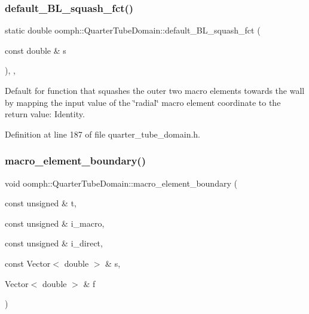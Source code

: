 \mbox{\label{classoomph_1_1QuarterTubeDomain_a3dc9c2857eb6bd7e3ee89d2a7c86bd3b}} 
\subsubsection{\texorpdfstring{default\+\_\+\+B\+L\+\_\+squash\+\_\+fct()}{default\_BL\_squash\_fct()}}
{\footnotesize\ttfamily static double oomph\+::\+Quarter\+Tube\+Domain\+::default\+\_\+\+B\+L\+\_\+squash\+\_\+fct (\begin{DoxyParamCaption}\item[{const double \&}]{s }\end{DoxyParamCaption})\hspace{0.3cm}{\ttfamily [inline]}, {\ttfamily [static]}, {\ttfamily [private]}}



Default for function that squashes the outer two macro elements towards the wall by mapping the input value of the \char`\"{}radial\char`\"{} macro element coordinate to the return value\+: Identity. 



Definition at line 187 of file quarter\+\_\+tube\+\_\+domain.\+h.

\mbox{\label{classoomph_1_1QuarterTubeDomain_afacee4fe8a6fbc33618643398f5b8ab1}} 
\subsubsection{\texorpdfstring{macro\+\_\+element\+\_\+boundary()}{macro\_element\_boundary()}}
{\footnotesize\ttfamily void oomph\+::\+Quarter\+Tube\+Domain\+::macro\+\_\+element\+\_\+boundary (\begin{DoxyParamCaption}\item[{const unsigned \&}]{t,  }\item[{const unsigned \&}]{i\+\_\+macro,  }\item[{const unsigned \&}]{i\+\_\+direct,  }\item[{const Vector$<$ double $>$ \&}]{s,  }\item[{Vector$<$ double $>$ \&}]{f }\end{DoxyParamCaption})}



